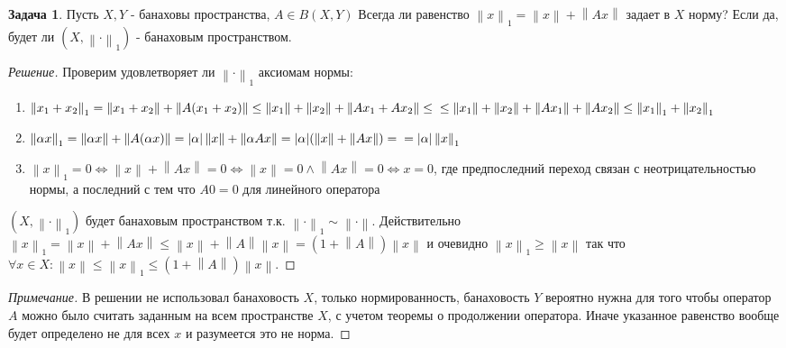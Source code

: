 \documentclass[12pt,a4paper]{article}
\theoremstyle{definition}
\newtheorem{exercise}{Задача}[section]
\newenvironment{solution}
{\renewcommand\qedsymbol{$\blacksquare$}\begin{proof}[Решение]}
{\end{proof}}
\newenvironment{note}
{\renewcommand\qedsymbol{}\begin{proof}[Примечание]}
	{\end{proof}}
\newcommand{\norm}[1]{\left\lVert#1\right\rVert}
\begin{document}
	\begin{exercise}
		Пусть $X,Y$ - банаховы пространства, $A\in B(X,Y)$ Всегда ли равенство $\norm{x}_1 = \norm{x} + \norm{Ax}$ задает в $X$ норму? Если да, будет ли $(X, \norm{\cdot}_1)$ - банаховым пространством.
	\end{exercise}
	\begin{solution}
		Проверим удовлетворяет ли $\norm{\cdot}_1$ аксиомам нормы:
		\begin{enumerate}
			\item $\norm{x_1 + x_2}_1 = \norm{x_1 + x_2} + \norm{A(x_1 + x_2)} \leq \norm{x_1} + \norm{x_2} + \norm{Ax_1 + Ax_2} \leq \newline
			\leq \norm{x_1} + \norm{x_2} + \norm{Ax_1} + \norm{Ax_2}
			\leq \norm{x_1}_1 + \norm{x_2}_1$
			
			\item $\norm{\alpha x}_1 = \norm{\alpha x} + \norm{A(\alpha x)} = |\alpha| \norm{x} + \norm{\alpha Ax} = |\alpha| (\norm{x} + \norm{Ax}) = \newline = |\alpha|\norm{x}_1$
			
			\item $\norm{x}_1 = 0 \Leftrightarrow \norm{x} + \norm{Ax} = 0 \Leftrightarrow \norm{x} = 0 \wedge \norm{Ax} = 0 \Leftrightarrow x = 0$, где предпоследний переход связан с неотрицательностью нормы, а последний с тем что $A0=0$ для линейного оператора
		\end{enumerate}
		$(X, \norm{\cdot}_1)$ будет банаховым пространством т.к. $\norm{\cdot}_1 \sim \norm{\cdot}$. Действительно $\norm{x}_1 = \norm{x} + \norm{Ax} \leq \norm{x} + \norm{A}\norm{x} = (1 + \norm{A})\norm{x}$ и очевидно $\norm{x}_1 \geq \norm{x}$ так что
		$\forall x\in X : \norm{x} \leq \norm{x}_1 \leq (1 + \norm{A})\norm{x}$.
	\end{solution}
	\begin{note}
		В решении не использовал банаховость $X$, только нормированность, банаховость $Y$ вероятно нужна для того чтобы оператор $A$ можно было считать заданным на всем пространстве $X$, с учетом теоремы о продолжении оператора. Иначе указанное равенство вообще будет определено не для всех $x$ и разумеется это не норма.
	\end{note}

	\newpage
	
\end{document}

